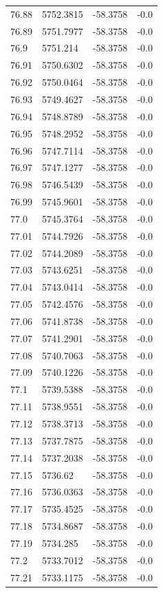 \begin{table}[H]
\begin{tabular}{llll}
76.88 & 5752.3815 & -58.3758 & -0.0 \\
76.89 & 5751.7977 & -58.3758 & -0.0 \\
76.9 & 5751.214 & -58.3758 & -0.0 \\
76.91 & 5750.6302 & -58.3758 & -0.0 \\
76.92 & 5750.0464 & -58.3758 & -0.0 \\
76.93 & 5749.4627 & -58.3758 & -0.0 \\
76.94 & 5748.8789 & -58.3758 & -0.0 \\
76.95 & 5748.2952 & -58.3758 & -0.0 \\
76.96 & 5747.7114 & -58.3758 & -0.0 \\
76.97 & 5747.1277 & -58.3758 & -0.0 \\
76.98 & 5746.5439 & -58.3758 & -0.0 \\
76.99 & 5745.9601 & -58.3758 & -0.0 \\
77.0 & 5745.3764 & -58.3758 & -0.0 \\
77.01 & 5744.7926 & -58.3758 & -0.0 \\
77.02 & 5744.2089 & -58.3758 & -0.0 \\
77.03 & 5743.6251 & -58.3758 & -0.0 \\
77.04 & 5743.0414 & -58.3758 & -0.0 \\
77.05 & 5742.4576 & -58.3758 & -0.0 \\
77.06 & 5741.8738 & -58.3758 & -0.0 \\
77.07 & 5741.2901 & -58.3758 & -0.0 \\
77.08 & 5740.7063 & -58.3758 & -0.0 \\
77.09 & 5740.1226 & -58.3758 & -0.0 \\
77.1 & 5739.5388 & -58.3758 & -0.0 \\
77.11 & 5738.9551 & -58.3758 & -0.0 \\
77.12 & 5738.3713 & -58.3758 & -0.0 \\
77.13 & 5737.7875 & -58.3758 & -0.0 \\
77.14 & 5737.2038 & -58.3758 & -0.0 \\
77.15 & 5736.62 & -58.3758 & -0.0 \\
77.16 & 5736.0363 & -58.3758 & -0.0 \\
77.17 & 5735.4525 & -58.3758 & -0.0 \\
77.18 & 5734.8687 & -58.3758 & -0.0 \\
77.19 & 5734.285 & -58.3758 & -0.0 \\
77.2 & 5733.7012 & -58.3758 & -0.0 \\
77.21 & 5733.1175 & -58.3758 & -0.0 \\

\end{tabular}
\end{table}

